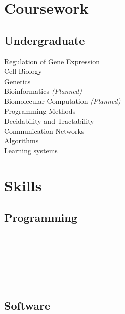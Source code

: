 \documentclass[]{resume}
\begin{document}
\begin{minipage}[t]{0.33\textwidth}

\section{Coursework}
\subsection{Undergraduate}
Regulation of Gene Expression \\
Cell Biology \\
Genetics \\
Bioinformatics {\footnotesize \textit{(Planned)}}\\
Biomolecular Computation {\footnotesize \textit{(Planned)}}\\
\sectionsep
{}
Programming Methods \\
Decidability and Tractability \\
Communication Networks \\
Algorithms \\
Learning systems
\sectionsep

\section{Skills}
\subsection{Programming}
\\
\\
\\
\\
\\
\sectionsep

\subsection{Software}
\\
\\
\\
\\
\\
\\
\\
\\
\sectionsep


\end{minipage}
\end{document}
